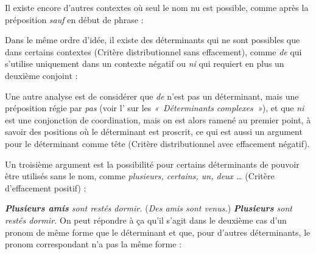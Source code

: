 Il existe encore d’autres contextes où seul le nom nu est possible, comme après la préposition \textit{sauf} en début de phrase :

\ea
  \z
\z

Dans le même ordre d’idée, il existe des déterminants qui ne sont possibles que dans certains contextes (Critère distributionnel sans effacement), comme \textit{de} qui s’utilise uniquement dans un contexte négatif ou \textit{ni} qui requiert en plus un deuxième conjoint :

\ea
  \z
\z
Une autre analyse est de considérer que \textit{de} n’est pas un déterminant, mais une préposition régie par \textit{pas} (voir l' sur les \textit{«~Déterminants} \textit{complexes~»}), et que \textit{ni} est une conjonction de coordination, mais on est alors ramené au premier point, à savoir des positions où le déterminant est proscrit, ce qui est aussi un argument pour le déterminant comme tête (Critère distributionnel avec effacement négatif).

Un troisième argument est la possibilité pour certains déterminants de pouvoir être utilisés sans le nom, comme \textit{plusieurs, certains, un, deux …} (Critère d’effacement positif) :

\ea
  \ea \textit{\textbf{{Plusieurs amis}}  {sont restés dormir.}}
  \ex (\textit{{Des amis sont venus.}}) \textit{\textbf{{Plusieurs}}  {sont restés dormir.}}
  \z
\z
On peut répondre à ça qu’il s’agit dans le deuxième cas d’un pronom de même forme que le déterminant et que, pour d’autres déterminants, le pronom correspondant n’a pas la même forme :

